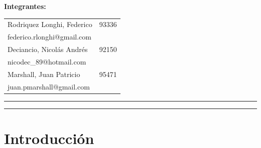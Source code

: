 \documentclass[11pt,a4paper]{article}
\newcommand\blankpage{%
	\null
	\thispagestyle{empty}%
	\addtocounter{page}{-1}%
	\newpage}
\begin{document}
\begin{titlepage}
	\begin{flushleft}
	\begin{table}[H]
		\begin{flushleft}
		\textbf{Integrantes:}\\
		\vspace{0.01\textheight}
		\begin{tabular}{l r}
			Rodriquez Longhi, Federico  & 93336\\
			\hspace{0.05\textheight}federico.rlonghi@gmail.com&\\
			Deciancio, Nicolás Andrés   & 92150\\
			\hspace{0.05\textheight}nicodec\_89@hotmail.com&\\
			Marshall, Juan Patricio & 95471\\
			\hspace{0.05\textheight}juan.pmarshall@gmail.com&\\
		\end{tabular}
		\end{flushleft}
	\end{table}
		

	\end{flushleft}
	\vspace{0.05\textheight}
	\vspace{2pt}
	\vfill
	\rule{\textwidth}{1pt}\par %
	\vspace{2pt}\vspace{-\baselineskip} %
	\rule{\textwidth}{0.4pt}\par %
	
\end{titlepage}

\blankpage

\tableofcontents

\newpage

\section{Introducción}
\end{document}

